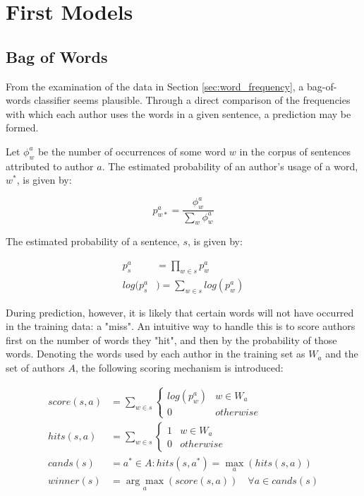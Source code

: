 \section{First Models}
\label{sec:first_models}

\subsection{Bag of Words}
\label{sec:bag_of_words}
From the examination of the data in Section \ref{sec:word_frequency}, a bag-of-words classifier seems plausible. Through a direct comparison of the frequencies with which each author uses the words in a given sentence, a prediction may be formed.

Let $\phi_w^a$ be the number of occurrences of some word $w$ in the corpus of sentences attributed to author $a$. The estimated probability of an author's usage of a word, $w^*$, is given by:

\begin{equation*}
p_{w*}^a = \frac{\phi_w^a}{\sum\limits_{w} \phi_w^a}
\end{equation*}

The estimated probability of a sentence, $s$, is given by:

\begin{align*}
p_{s}^a &= \prod\limits_{w\in s} p_{w}^a \\
log(p_{s}^a &)= \sum\limits_{w\in s} log(p_{w}^a)
\end{align*}

During prediction, however, it is likely that certain words will not have occurred in the training data: a "miss". An intuitive way to handle this is to score authors first on the number of words they "hit", and then by the probability of those words. Denoting the words used by each author in the training set as $W_a$ and the set of authors $A$, the following scoring mechanism is introduced:

\begin{align*}
score(s,a) &= \sum\limits_{w\in s}
\begin{cases}
log(p_{w}^a) & w\in W_a \\
0 & otherwise
\end{cases}\\
hits(s,a) &= \sum\limits_{w\in s}
\begin{cases}
1 & w\in W_a \\
0 & otherwise
\end{cases}\\
cands(s) &= a^* \in A : hits(s,a^*) = \max_a(hits(s,a))\\
winner(s) &= \underset{a}{\arg\max}(score(s,a))\quad \forall a \in cands(s)
\end{align*}

